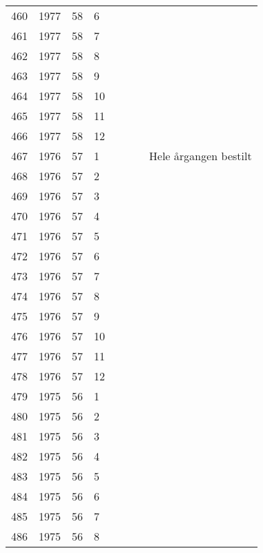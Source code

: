 \begin{longtable}{ |l|l|l|l|l|l|l|l| }
460 & 1977 & 58 &     6 &         &                &  & \\
461 & 1977 & 58 &     7 &         &                &  & \\
462 & 1977 & 58 &     8 &         &                &  & \\
463 & 1977 & 58 &     9 &         &                &  & \\
464 & 1977 & 58 &    10 &         &                &  & \\
465 & 1977 & 58 &    11 &         &                &  & \\
466 & 1977 & 58 &    12 &         &                &  & \\
467 & 1976 & 57 &     1 &         &                &  & Hele årgangen bestilt\\
468 & 1976 & 57 &     2 &         &                &  & \\
469 & 1976 & 57 &     3 &         &                &  & \\
470 & 1976 & 57 &     4 &         &                &  & \\
471 & 1976 & 57 &     5 &         &                &  & \\
472 & 1976 & 57 &     6 &         &                &  & \\
473 & 1976 & 57 &     7 &         &                &  & \\
474 & 1976 & 57 &     8 &         &                &  & \\
475 & 1976 & 57 &     9 &         &                &  & \\
476 & 1976 & 57 &    10 &         &                &  & \\
477 & 1976 & 57 &    11 &         &                &  & \\
478 & 1976 & 57 &    12 &         &                &   & \\
479 & 1975 & 56 &     1 &         &                &  & \\
480 & 1975 & 56 &     2 &         &                &  & \\
481 & 1975 & 56 &     3 &         &                &  & \\
482 & 1975 & 56 &     4 &         &                &  & \\
483 & 1975 & 56 &     5 &         &                &  & \\
484 & 1975 & 56 &     6 &         &                &  & \\
485 & 1975 & 56 &     7 &         &                &  & \\
486 & 1975 & 56 &     8 &         &                &  & \\

\end{longtable}
